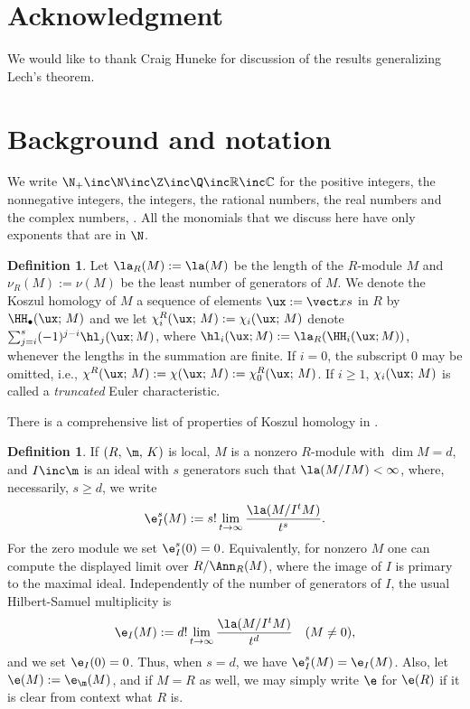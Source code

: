 \documentclass[12pt]{amsart}
\theoremstyle{plain}
\theoremstyle{remark}
\theoremstyle{definition}
\newtheorem{definition}[theorem]{Definition}
\numberwithin{equation}{theorem}
\renewcommand{\geq}{\geqslant} \renewcommand{\leq}{\leqslant}
\begin{document}
\section*{Acknowledgment}

We would like to thank Craig Huneke for discussion of the results generalizing Lech's theorem.

\section{Background and notation}

We write $\N_+ \inc \N \inc \Z \inc \Q \inc \mathbb{R} \inc \mathbb{C}$ for the positive integers, the nonnegative integers, the integers, 
the rational numbers, the real numbers and the complex numbers, \resp.  All the monomials that we
discuss here have only exponents that are in $\N$.


\begin{definition}\label{kz} Let $\la_R(M) := \la(M)$ be the length of 
the $R$-module $M$ and $\nu_R(M) := \nu(M)$ be the 
least number of 
generators of $M$.  We denote the Koszul homology of 
$M$ \wrt a 
sequence of  elements  $\ux := \vect x{s}$ in $R$ by 
$\HH_{\bullet}(\ux;\,M)$ and we let $\chi^R_i(\ux; \, M) := \chi_i(\ux;\, M)$  denote 
$\sum_{j=i}^{s} (-1)^{j-i}\hl_j(\ux;M)$, where
$\hl_i(\ux;M):=\la_R(\HH_i(\ux;M))$, whenever the lengths in the summation 
are finite. If $i = 0$, the subscript 0 may be omitted, i.e., 
$\chi^R(\ux; \, M) := \chi(\ux; \, M) := \chi^R_0(\ux; \, M)$.  If $i \geq 1$,
$\chi_i(\ux;\,M)$ is called a {\it truncated} Euler characteristic. \end{definition} 

There is a comprehensive list of properties of Koszul homology in \cite[Thm.\,3.4]{BHM26}.

\smallskip


\begin{definition}\label{mult} If  $(R, \, \m, \, K)$ is local, $M$ is a 
nonzero \fg $R$-module with $\dim M=d$, and $I \inc \m$ is an ideal with $s$ generators 
such that $\la(M/IM)<\infty$, where,
necessarily, $s \geq d$, we write
\[ \e_I^s(M) := s! \lim_{t \to \infty} \frac{\la(M/I^tM)}{t^s}.\] 
For the zero module we set $\e_I^s(0)=0$. Equivalently, for nonzero $M$ 
one can compute the displayed limit over $R/\Ann_R(M)$, where the image 
of $I$ is primary to the maximal ideal. Independently of the number 
of generators of $I$, the usual 
Hilbert-Samuel multiplicity is
\[
\e_I(M):=d!\lim_{t\to\infty}\frac{\la(M/I^tM)}{t^d}
\quad(M\ne0),
\]
and we set $\e_I(0)=0$. Thus, when $s=d$, we have
$\e_I^s(M)=\e_I(M)$. Also, let   $\e(M) := \e_{\m}(M)$, 
and if $M = R$ as well, we may simply write $\e$  for $\e(R)$ 
if it is clear from context what $R$ is.
\end{definition}
\end{document}
